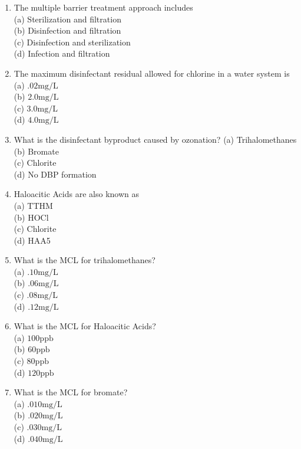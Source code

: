 \documentclass[10pt]{article}
\begin{document}
\begin{enumerate}
\begin{enumerate}
\begin{enumerate}
  \item The multiple barrier treatment approach includes\\
(a) Sterilization and filtration\\
(b) Disinfection and filtration\\
(c) Disinfection and sterilization\\
(d) Infection and filtration

  \item The maximum disinfectant residual allowed for chlorine in a water system is\\
(a) $.02 \mathrm{mg} / \mathrm{L}$\\
(b) $2.0 \mathrm{mg} / \mathrm{L}$\\
(c) $3.0 \mathrm{mg} / \mathrm{L}$\\
(d) $4.0 \mathrm{mg} / \mathrm{L}$ 

\item What is the disinfectant byproduct caused by ozonation?
(a) Trihalomethanes\\
(b) Bromate\\
(c) Chlorite\\
(d) No DBP formation\\

  \item Haloacitic Acids are also known as\\
(a) TTHM\\
(b) HOCl\\
(c) Chlorite\\
(d) HAA5

  \item What is the MCL for trihalomethanes?\\
(a) $.10 \mathrm{mg} / \mathrm{L}$\\
(b) $.06 \mathrm{mg} / \mathrm{L}$\\
(c) $.08 \mathrm{mg} / \mathrm{L}$\\
(d) $.12 \mathrm{mg} / \mathrm{L}$

  \item What is the MCL for Haloacitic Acids?\\
(a) $100 \mathrm{ppb}$\\
(b) $60 \mathrm{ppb}$\\
(c) $80 \mathrm{ppb}$\\
(d) $120 \mathrm{ppb}$

  \item What is the MCL for bromate?\\
(a) $.010 \mathrm{mg} / \mathrm{L}$\\
(b) $.020 \mathrm{mg} / \mathrm{L}$\\
(c) $.030 \mathrm{mg} / \mathrm{L}$\\
(d) $.040 \mathrm{mg} / \mathrm{L}$\\


\end{enumerate}
\end{enumerate}
\end{enumerate}
\end{document}
